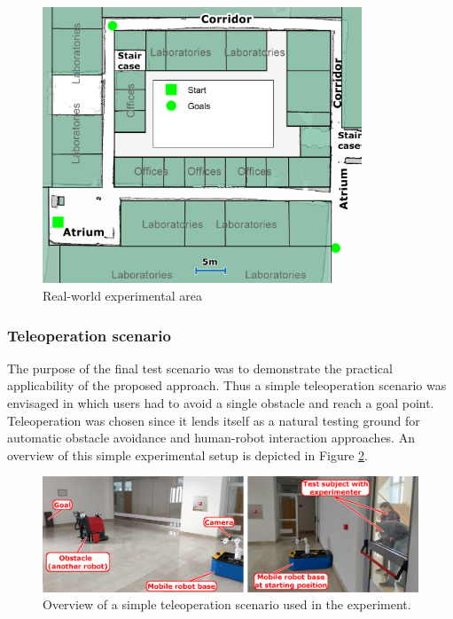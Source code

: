 \begin{figure}
    \centering
    \includegraphics[width=0.85\textwidth]{slike/Fig03_17.png}
    \caption{Real-world experimental area}
    \label{fig:FESB4kat}
\end{figure}

\subsubsection{Teleoperation scenario}
\label{sec:MediationApp}

The purpose of the final test scenario was to demonstrate the practical applicability of the proposed approach. Thus a simple teleoperation scenario was envisaged in which users had to avoid a single obstacle and reach a goal point. Teleoperation was chosen since it lends itself as a natural testing ground for automatic obstacle avoidance and human-robot interaction approaches. An overview of this simple experimental setup is depicted in Figure \ref{Fig:tele2Course}.

\begin{figure}
\centering
\includegraphics[width=1\columnwidth]{slike/Fig03_18.png}
\caption{Overview of a simple teleoperation scenario used in the experiment.}
\label{Fig:tele2Course}
\end{figure}

